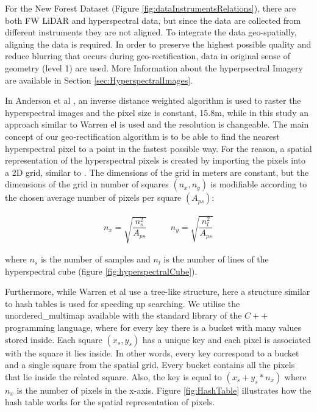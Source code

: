 \documentclass{subfiles}
\begin{document}
	\par For the New Forest Dataset (Figure \ref{fig:dataInstrumentsRelations}), there are both FW LiDAR and hyperspectral data, but since the data are collected from different instruments they are not aligned. To integrate the data geo-spatially, aligning the data is required. In order to preserve the highest possible quality and reduce blurring that occurs during geo-rectification, data in original sense of geometry (level 1) are used. More Information about the hyperpsectral Imagery are available in Section \ref{sec:HyperspectralImages}.
	
	\par In Anderson et al \cite{Anderson2008}, an inverse distance weighted algorithm is used to raster the hyperspectral images and the pixel size is constant, 15.8m, while in this study an approach similar to Warren el \cite{Warren2014} is used and the resolution is changeable. The main concept of our geo-rectification algorithm is to be able to find the nearest hyperspectral pixel to a point in the fastest possible way. For the reason, a spatial representation of the hyperspectral pixels is created by importing the pixels into a 2D grid, similar to \cite{Warren2014}. The dimensions of the grid in meters are constant, but the dimensions of the grid in number of squares $(n_x, n_y)$ is modifiable according to the chosen average number of pixels per square $(A_{ps})$: 
	
	\begin{eqnarray}
		n_x=\sqrt{\dfrac{n_s^2}{A_{ps}}} \;\;\;\;\;\;\;\;\;\; n_y=\sqrt{\dfrac{n_l^2}{A_{ps}}}   
	\end{eqnarray} 
	
	\par where $n_s$  is  the number of samples and $n_l$ is the number of lines of the hyperspectral cube (figure \ref{fig:hyperspectralCube}).
	
	\par Furthermore, while Warren et al use a tree-like structure, here a structure similar to hash tables is used for speeding up searching. We utilise the unordered\_multimap available with the standard library of the $C++$ programming language, where for every key there is a bucket with many values stored inside. Each square $(x_s,y_s)$	has a unique key and each pixel is associated with the square it lies inside. In other words, every key correspond to a bucket and a single square from the spatial grid. Every bucket contains all the pixels that lie inside the related square. Also, the key is equal to $(x_s + y_s *n_x)$ where $n_x$ is the number of pixels in the x-axis. Figure \ref{fig:HashTable} illustrates how the hash table works for the spatial representation of pixels. 
	
\end{document}
